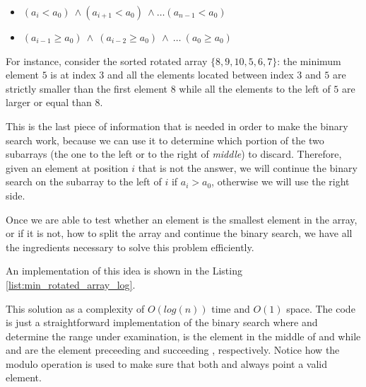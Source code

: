 \begin{itemize}
	\item $	(a_i < a_0) \: \wedge (a_{i+1} < a_0) \: \wedge \ldots (a_{n-1} < a_0) $
	\item $	(a_{i-1} \geq a_0) \: \wedge \: (a_{i-2} \geq a_0) \: \wedge \: \ldots \: (a_{0} \geq a_0) $
\end{itemize}
For instance, consider the sorted rotated array $\{8,9,10,5,6,7\}$: the minimum element $5$ is at index $3$ and all the elements located between index $3$ and $5$ are strictly smaller than the first element $8$ while all the elements to the left of $5$ are larger or equal than $8$.

This is the last piece of information that is needed in order to make the binary search work, because we can use it to determine which portion of the two subarrays (the one to the left or to the right of \textit{middle}) to discard. Therefore, given an element at position $i$ that is not the answer, we will continue the binary search on the subarray to the left of $i$ if $a_i > a_0$, otherwise we will use the right side.

Once we are able to test whether an element is the smallest element in the array, or if it is not, how to split the array and continue the binary search, we have all the ingredients necessary to solve this problem efficiently.

An implementation of this idea is shown in the Listing \ref{list:min_rotated_array_log}. 




This solution as a complexity of $O(log(n))$ time and $O(1)$ space.
The code is just a straightforward implementation of the binary search where  and  determine the range under examination,  is the element in the middle of  and  while  and  are the element preceeding and succeeding , respectively. Notice how the modulo operation is used to make sure that both  and  always point a valid element. 
